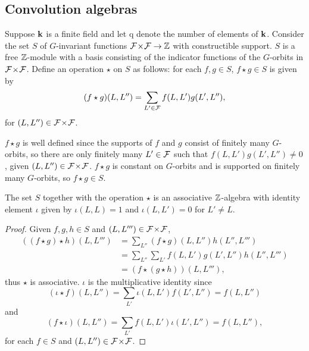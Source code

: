 \documentclass[a4paper, 11pt]{report}
\begin{document}
\subsection{Convolution algebras}

Suppose $\mathbf{k}$ is a finite field and let $\mathrm{q}$ denote the number of elements of $\mathbf{k}$. Consider the set $S$ of $G$-invariant functions ${\mathcal{F}\!\times\!\mathcal{F}}\to\mathbb{Z}$ with constructible support. $S$ is a free $\mathbb{Z}$-module with a basis consisting of the indicator functions of the $G$-orbits in ${\mathcal{F}\!\times\!\mathcal{F}}$. Define an operation $\star$ on $S$ as follows: for each $f,g\in S$, $f\star g\in S$ is given by
\begin{equation*}
(f\star g)(L,L'') = \sum_{L'\in\mathcal{F}} f(L,L')g(L',L''),
\end{equation*}
for $(L,L'')\in{\mathcal{F}\!\times\!\mathcal{F}}$. 

$f\star g$ is well defined since the supports of $f$ and $g$ consist of finitely many $G$-orbits, so there are only finitely many $L'\in\mathcal{F}$ such that $f(L,L')g(L',L'')\neq 0$, given $(L,L'')\in{\mathcal{F}\!\times\!\mathcal{F}}$. $f\star g$ is constant on $G$-orbits and is supported on finitely many $G$-orbits, so $f\star g\in S$.

\begin{lemma}\label{lemma:convolution-algebra}
The set $S$ together with the operation $\star$ is an associative $\mathbb{Z}$-algebra with identity element $\iota$ given by $\iota(L,L) = 1$ and $\iota(L,L')=0$ for $L'\neq L$.
\end{lemma}

\begin{proof}
Given $f,g,h\in S$ and $(L,L''')\in{\mathcal{F}\!\times\!\mathcal{F}}$,
\begin{align*}
((f\star g)\star h)(L,L''')
&= \sum_{L''} (f\star g)(L,L'')h(L'',L''')\\
&= \sum_{L''}\sum_{L'} f(L,L')g(L',L'')h(L'',L''')\\
&= (f\star (g\star h))(L,L'''),
\end{align*}
thus $\star$ is associative. $\iota$ is the multiplicative identity since
\begin{equation*}
(\iota\star f)(L,L'') = \sum_{L'}\iota(L,L')f(L',L'') = f(L,L'')
\end{equation*}
and
\begin{equation*}
(f\star\iota)(L,L'') = \sum_{L'}f(L,L')\iota(L',L'') = f(L,L''),
\end{equation*}
for each $f\in S$ and $(L,L'')\in{\mathcal{F}\!\times\!\mathcal{F}}$.
\end{proof}
\end{document}

